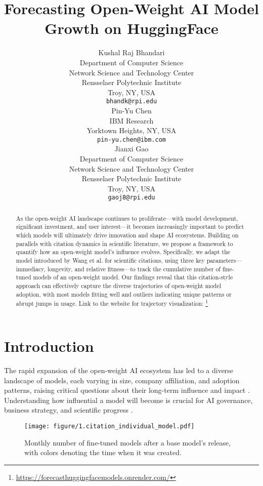 \documentclass{article} %
\date{}
\title{Forecasting Open-Weight AI Model Growth on HuggingFace}
\author{Kushal Raj Bhandari\\
        Department of Computer Science\\
        Network Science and Technology Center\\
        Rensselaer Polytechnic Institute\\
        Troy, NY, USA \\
        \texttt{bhandk@rpi.edu}\\
        \And
        Pin-Yu Chen\\
        IBM Research \\
        Yorktown Heights, NY, USA \\
        \texttt{pin-yu.chen@ibm.com}\\
        \And 
         Jianxi Gao\\
        Department of Computer Science\\
        Network Science and Technology Center\\
        Rensselaer Polytechnic Institute\\
        Troy, NY, USA \\
        \texttt{gaoj8@rpi.edu}\\
        }
\newcommand{\PYB}[1]{{\color{blue}[PY: #1]}}
\begin{document}
    \maketitle

    \begin{abstract}
    As the open-weight AI landscape continues to proliferate—with model development, significant investment, and user interest—it becomes increasingly important to predict which models will ultimately drive innovation and shape AI ecosystems. Building on parallels with citation dynamics\cite{wangQuantifyingLongTermScientific2013} in scientific literature, we propose a framework to quantify how an open-weight model’s influence evolves. Specifically, we adapt the model introduced by Wang et al. for scientific citations, using three key parameters—immediacy, longevity, and relative fitness—to track the cumulative number of fine-tuned models of an open-weight model. Our findings reveal that this citation-style approach can effectively capture the diverse trajectories of open-weight model adoption, with most models fitting well and outliers indicating unique patterns or abrupt jumps in usage. Link to the website for trajectory visualization: 
    \footnote{\url{https://forecasthuggingfacemodels.onrender.com/}}
    \end{abstract}

    \section{Introduction}
       The rapid expansion of the open-weight AI ecosystem has led to a diverse landscape of models, each varying in size, company affiliation, and adoption patterns, raising critical questions about their long-term influence and impact \cite{bommasaniOpportunitiesRisksFoundation2022}. Understanding how influential a model will become is crucial for AI governance, business strategy, and scientific progress \cite{costaDemocratizationArtificialIntelligence2024, luitseGreatTransformerExamining2021, euArtificialIntelligenceAct, maslejArtificialIntelligenceIndex2024}. 
        \begin{figure}[ht]
            \begin{center}
                \texttt{[image: figure/1.citation\_individual\_model.pdf]}
            \end{center}
            \caption{Monthly number of fine-tuned models after a base model’s release, with colors denoting the time when it was created. }
            \label{fig:monthly_finetune_number}
        \end{figure}
        
\end{document}
